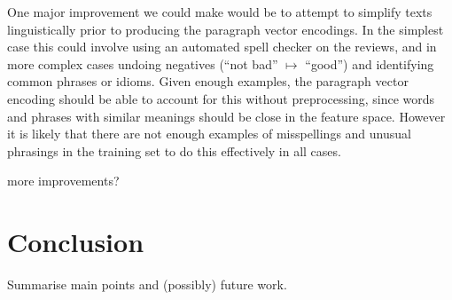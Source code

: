 \documentclass[11pt]{article}
\newcommand{\drafting}[1]{\textcolor{OliveGreen}{#1}}
\begin{document}
One major improvement we could make would be to attempt to simplify texts linguistically prior to producing the paragraph vector encodings. In the simplest case this could involve using an automated spell checker on the reviews, and in more complex cases undoing negatives (``not bad'' $\mapsto$ ``good'') and identifying common phrases or idioms. Given enough examples, the paragraph vector encoding should be able to account for this without preprocessing, since words and phrases with similar meanings should be close in the feature space. However it is likely that there are not enough examples of misspellings and unusual phrasings in the training set to do this effectively in all cases.

\drafting{more improvements?}


\section{Conclusion}
\drafting{Summarise main points and (possibly) future work.}


\nocite{mukherjee_what_2013}
\nocite{rayana_collective_2015}

\nocite{sklearn_pedregosa_scikit-learn_2011}
\nocite{gensim_rehurek_software_2010}


\end{document}
